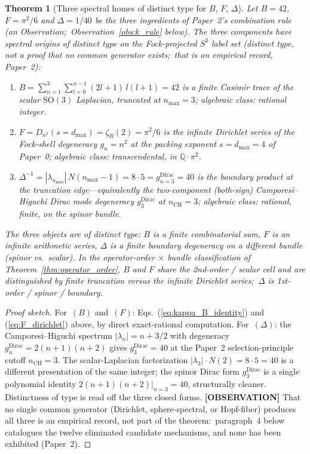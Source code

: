 \documentclass[aps,pra,twocolumn,superscriptaddress,longbibliography]{revtex4-2}
\newtheorem{theorem}{Theorem}
\begin{document}
\begin{theorem}[Three spectral homes of distinct type for $B$, $F$, $\Delta$]
\label{thm:k_decomposition}
Let $B = 42$, $F = \pi^2/6$ and $\Delta = 1/40$ be the three
ingredients of Paper~2's combination rule~\cite{loutey_paper2} (an
Observation;\ Observation~\ref{obs:k_rule} below).  The three components have spectral origins of
distinct type on the Fock-projected $S^3$ label set (distinct type, not
a proof that no common generator exists;\ that is an empirical record,
Paper~2):
\begin{enumerate}
\item[(B)] $B = \sum_{n=1}^{3} \sum_{l=0}^{n-1} (2l{+}1)\,l(l{+}1)
= 42$ is a \emph{finite} Casimir trace of the scalar
$\mathrm{SO}(3)$ Laplacian, truncated at $n_{\max} = 3$;
algebraic class: rational integer.
\item[(F)] $F = D_{n^2}(s = d_{\max}) = \zeta_R(2) = \pi^2/6$
is the \emph{infinite} Dirichlet series of the Fock-shell degeneracy
$g_n = n^2$ at the packing exponent $s = d_{\max} = 4$ of Paper~0;
algebraic class: transcendental, in $\mathbb{Q}\cdot\pi^2$.
\item[($\Delta$)] $\Delta^{-1} = |\lambda_{n_{\max}}|\,
N(n_{\max}{-}1) = 8 \cdot 5 = g_{n=3}^{\mathrm{Dirac}} = 40$ is the
\emph{boundary} product at the truncation edge---equivalently the
two-component (both-sign) Camporesi--Higuchi Dirac mode degeneracy $g_3^{\mathrm{Dirac}}$ at
$n_{\mathrm{CH}} = 3$; algebraic class: rational, finite, on the
\emph{spinor} bundle.
\end{enumerate}
The three objects are of distinct type:
$B$ is a finite combinatorial sum, $F$ is an infinite arithmetic
series, $\Delta$ is a finite boundary degeneracy on a different
bundle (spinor vs.\ scalar).  In the operator-order $\times$ bundle
classification of Theorem~\ref{thm:operator_order}, $B$ and $F$ share
the 2nd-order / scalar cell and are distinguished by finite truncation
versus the infinite Dirichlet series;\ $\Delta$ is 1st-order / spinor /
boundary.
\end{theorem}

\begin{proof}[Proof sketch]
For~$(B)$ and~$(F)$: Eqs.~(\ref{eq:kappa_B_identity}) and
(\ref{eq:F_dirichlet}) above, by direct exact-rational computation.
For~$(\Delta)$: the Camporesi--Higuchi spectrum
$|\lambda_n| = n + 3/2$ with degeneracy
$g_n^{\mathrm{Dirac}} = 2(n+1)(n+2)$ gives $g_3^{\mathrm{Dirac}} = 40$
at the Paper~2 selection-principle cutoff $n_{\mathrm{CH}} = 3$.
The scalar-Laplacian factorization $|\lambda_3|\cdot N(2) =
8 \cdot 5 = 40$ is a different presentation of the same integer; the
spinor Dirac form $g_3^{\mathrm{Dirac}}$ is a single polynomial
identity $2(n{+}1)(n{+}2)|_{n=3} = 40$, structurally cleaner.
Distinctness of type is read off the three closed forms.
\textbf{[OBSERVATION]} That no single common generator (Dirichlet,
sphere-spectral, or Hopf-fiber) produces all three is an empirical
record, not part of the theorem:\ paragraph~4 below catalogues the
twelve eliminated candidate mechanisms, and none has been exhibited
(Paper~2).
\end{proof}
\end{document}
